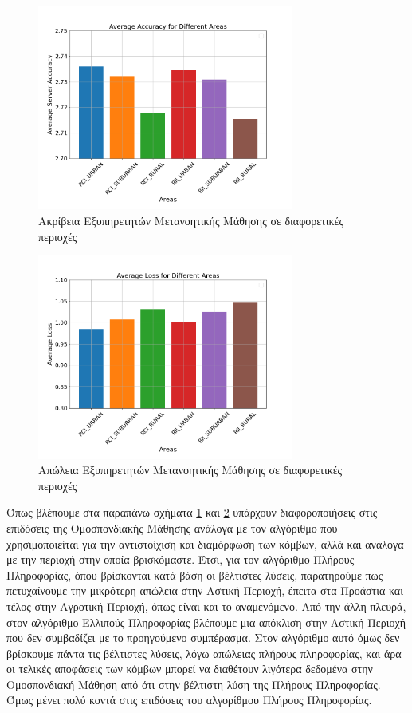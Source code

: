 \begin{figure}[H]
    \centering
    \includegraphics[width=0.75\textwidth]{figures/chapter4/Area_Average_Accuracy.png}
    \caption{Ακρίβεια Εξυπηρετητών Μετανοητικής Μάθησης σε διαφορετικές περιοχές}
    \label{fig21}
\end{figure}

\begin{figure}[H]
    \centering
    \includegraphics[width=0.75\textwidth]{figures/chapter4/Area_of_Average_Loss.png}
    \caption{Απώλεια Εξυπηρετητών Μετανοητικής Μάθησης σε διαφορετικές περιοχές}
    \label{fig22}
\end{figure}

\newpage

Όπως βλέπουμε στα παραπάνω σχήματα \ref{fig21} και \ref{fig22} υπάρχουν διαφοροποιήσεις στις επιδόσεις της Ομοσπονδιακής Μάθησης ανάλογα με τον αλγόριθμο που χρησιμοποιείται για την αντιστοίχιση και διαμόρφωση των κόμβων, αλλά και ανάλογα με την περιοχή στην οποία βρισκόμαστε. Έτσι, για τον αλγόριθμο Πλήρους Πληροφορίας, όπου βρίσκονται κατά βάση οι βέλτιστες λύσεις, παρατηρούμε πως πετυχαίνουμε την μικρότερη απώλεια στην Αστική Περιοχή, έπειτα στα Προάστια και τέλος στην Αγροτική Περιοχή, όπως είναι και το αναμενόμενο. Από την άλλη πλευρά, στον αλγόριθμο Ελλιπούς Πληροφορίας βλέπουμε μια απόκλιση στην Αστική Περιοχή που δεν συμβαδίζει με το προηγούμενο συμπέρασμα. Στον αλγόριθμο αυτό όμως δεν βρίσκουμε πάντα τις βέλτιστες λύσεις, λόγω απώλειας πλήρους πληροφορίας, και άρα οι τελικές αποφάσεις των κόμβων μπορεί να διαθέτουν λιγότερα δεδομένα στην Ομοσπονδιακή Μάθηση από ότι στην βέλτιστη λύση της Πλήρους Πληροφορίας. Όμως μένει πολύ κοντά στις επιδόσεις του αλγορίθμου Πλήρους Πληροφορίας.

